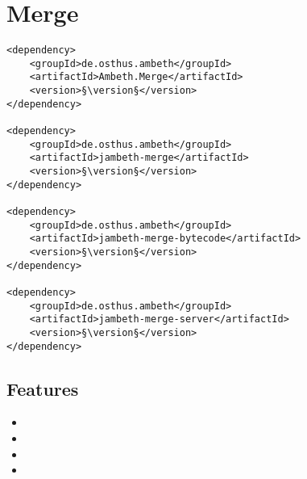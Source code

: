 \section{Merge}
\label{module:Merge}
\ClearAPI
\TODO
\begin{lstlisting}[style=POM,caption={Maven modules to use \emph{Ambeth Merge}}]
<dependency>
	<groupId>de.osthus.ambeth</groupId>
	<artifactId>Ambeth.Merge</artifactId>
	<version>§\version§</version>
</dependency>

<dependency>
	<groupId>de.osthus.ambeth</groupId>
	<artifactId>jambeth-merge</artifactId>
	<version>§\version§</version>
</dependency>

<dependency>
	<groupId>de.osthus.ambeth</groupId>
	<artifactId>jambeth-merge-bytecode</artifactId>
	<version>§\version§</version>
</dependency>

<dependency>
	<groupId>de.osthus.ambeth</groupId>
	<artifactId>jambeth-merge-server</artifactId>
	<version>§\version§</version>
</dependency>
\end{lstlisting}
\subsection{Features}
\begin{itemize}
	\item {}
	\item {}
	\item {}
	\item {}
\end{itemize}

